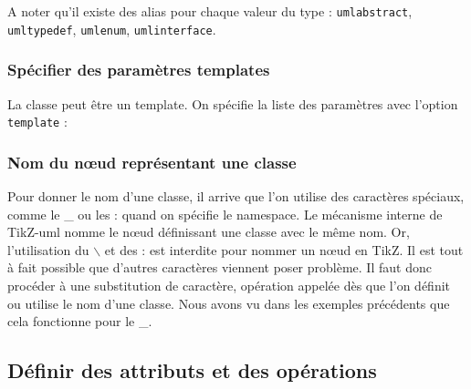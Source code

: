 \documentclass[a4paper,11pt]{report}
\newcommand{\inputTikZ}[1]{%
  }%
\newcommand{\inputTikZ}[1]{%
    \texttt{[image: fig/\#1.pdf]}%
  }%
\newcommand{\tuml}{{\sc TikZ-uml}}
\newcommand{\TikZ}{{\sc TikZ}}
\begin{document}
\medskip

\begin{minipage}{0.5\textwidth}

\end{minipage}
\begin{minipage}{0.4\textwidth}
\begin{center}
\inputTikZ{classabstract}
\end{center}
\end{minipage}

A noter qu'il existe des alias pour chaque valeur du type : {\tt umlabstract}, {\tt umltypedef}, {\tt umlenum}, {\tt umlinterface}.

\subsubsection{Spécifier des paramètres templates}

La classe peut être un template. On spécifie la liste des paramètres avec l'option {\tt template} :

\medskip

\begin{minipage}{0.5\textwidth}

\end{minipage}
\begin{minipage}{0.4\textwidth}
\begin{center}
\inputTikZ{classtemplate}
\end{center}
\end{minipage}

\subsubsection{Nom du n\oe{}ud représentant une classe}

Pour donner le nom d'une classe, il arrive que l'on utilise des caractères spéciaux, comme le \_{} ou les : quand on spécifie le namespace. Le mécanisme interne de \tuml{} nomme le n\oe{}ud définissant une classe avec le même nom. Or, l'utilisation du $\backslash$ et des : est interdite pour nommer un n\oe{}ud en \TikZ. Il est tout à fait possible que d'autres caractères viennent poser problème. Il faut donc procéder à une substitution de caractère, opération appelée dès que l'on définit ou utilise le nom d'une classe. Nous avons vu dans les exemples précédents que cela fonctionne pour le \_{}.

\subsection{Définir des attributs et des opérations}\label{ss.attrop}
\end{document}
